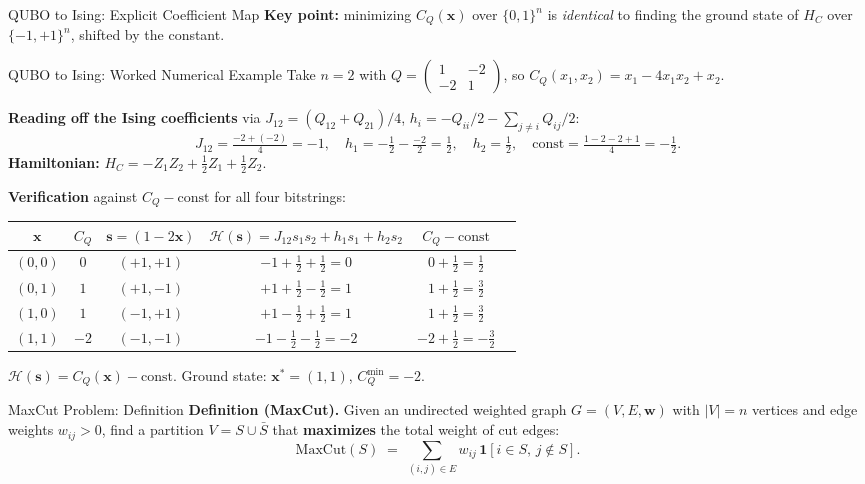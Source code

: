 \documentclass{beamer}
\begin{document}
\begin{frame}
\begin{frame}{QUBO to Ising: Explicit Coefficient Map}
\textbf{Key point:} minimizing $C_Q(\mathbf{x})$ over
$\{0,1\}^n$ is \emph{identical} to finding the ground state of $H_C$
over $\{-1,+1\}^n$, shifted by the constant.
\end{frame}


\begin{frame}{QUBO to Ising: Worked Numerical Example}
Take $n=2$ with $Q = \begin{pmatrix}1 & -2\\ -2 & 1\end{pmatrix}$,
so $C_Q(x_1,x_2) = x_1 - 4x_1x_2 + x_2$.

\medskip
\textbf{Reading off the Ising coefficients} via $J_{12}=(Q_{12}+Q_{21})/4$,
$h_i = -Q_{ii}/2 - \sum_{j\neq i}Q_{ij}/2$:
\[
J_{12} = \tfrac{-2+(-2)}{4} = -1,\quad
h_1 = -\tfrac{1}{2}-\tfrac{-2}{2} = \tfrac{1}{2},\quad
h_2 = \tfrac{1}{2},\quad
\text{const} = \tfrac{1-2-2+1}{4} = -\tfrac{1}{2}.
\]
\textbf{Hamiltonian:}
$H_C = -Z_1Z_2 + \tfrac{1}{2}Z_1 + \tfrac{1}{2}Z_2$.

\medskip
\textbf{Verification} against $C_Q - \text{const}$ for all four bitstrings:
\begin{center}
\small
\begin{tabular}{cccccc}
\hline
$\mathbf{x}$ & $C_Q$ & $\mathbf{s}=(1-2\mathbf{x})$ & $\mathcal{H}(\mathbf{s})=J_{12}s_1s_2+h_1s_1+h_2s_2$ & $C_Q-\text{const}$ \\
\hline
$(0,0)$ & $0$  & $(+1,+1)$ & $-1+\tfrac{1}{2}+\tfrac{1}{2}=0$ & $0+\tfrac{1}{2}=\tfrac{1}{2}$ \\
$(0,1)$ & $1$  & $(+1,-1)$ & $+1+\tfrac{1}{2}-\tfrac{1}{2}=1$ & $1+\tfrac{1}{2}=\tfrac{3}{2}$ \\
$(1,0)$ & $1$  & $(-1,+1)$ & $+1-\tfrac{1}{2}+\tfrac{1}{2}=1$ & $1+\tfrac{1}{2}=\tfrac{3}{2}$ \\
$(1,1)$ & $-2$ & $(-1,-1)$ & $-1-\tfrac{1}{2}-\tfrac{1}{2}=-2$ & $-2+\tfrac{1}{2}=-\tfrac{3}{2}$ \\
\hline
\end{tabular}
\end{center}
$\mathcal{H}(\mathbf{s}) = C_Q(\mathbf{x}) - \text{const}$. \checkmark\quad
Ground state: $\mathbf{x}^*=(1,1)$, $C_Q^{\min}=-2$.
\end{frame}


\begin{frame}{MaxCut Problem: Definition}
\textbf{Definition (MaxCut).}  Given an undirected weighted graph
$G = (V,E,\mathbf{w})$ with $|V|=n$ vertices and edge weights
$w_{ij}>0$, find a partition $V = S \cup \bar{S}$ that
\textbf{maximizes} the total weight of cut edges:
\[
\text{MaxCut}(S) \;=\; \sum_{(i,j)\in E} w_{ij}\,
\mathbf{1}[i\in S,\,j\notin S].
\]


\end{frame}
\end{frame}
\end{document}
